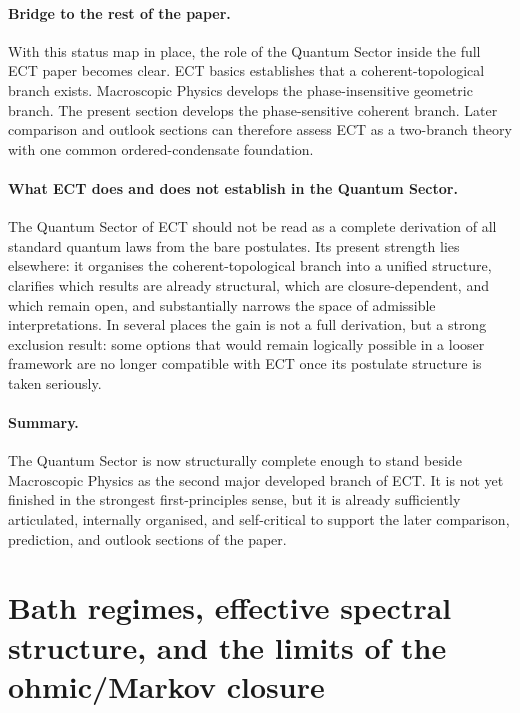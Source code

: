 \paragraph{Bridge to the rest of the paper.}
With this status map in place, the role of the Quantum Sector inside
the full ECT paper becomes clear.
ECT basics establishes that a coherent-topological branch exists.
Macroscopic Physics develops the phase-insensitive geometric branch.
The present section develops the phase-sensitive coherent branch.
Later comparison and outlook sections can therefore assess ECT as a
two-branch theory with one common ordered-condensate foundation.

\paragraph{What ECT does and does not establish in the Quantum Sector.}
The Quantum Sector of ECT should not be read as a complete derivation
of all standard quantum laws from the bare postulates.
Its present strength lies elsewhere: it organises the
coherent-topological branch into a unified structure, clarifies which
results are already structural, which are closure-dependent, and which
remain open, and substantially narrows the space of admissible
interpretations.
In several places the gain is not a full derivation, but a strong
exclusion result: some options that would remain logically possible
in a looser framework are no longer compatible with ECT once its
postulate structure is taken seriously.

\paragraph{Summary.}
The Quantum Sector is now structurally complete enough to stand beside
Macroscopic Physics as the second major developed branch of ECT.
It is not yet finished in the strongest first-principles sense, but it
is already sufficiently articulated, internally organised, and
self-critical to support the later comparison, prediction, and outlook
sections of the paper.


\section{Bath regimes, effective spectral structure, and the limits
of the ohmic/Markov closure}
\label{app:qs_bath_regimes}

